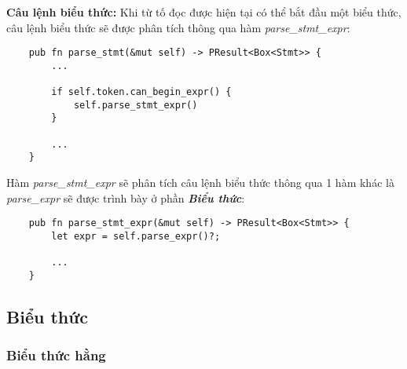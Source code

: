\textbf{Câu lệnh biểu thức:} Khi từ tố đọc được hiện tại có thể bắt đầu một biểu thức, câu lệnh biểu thức sẽ được phân tích thông qua hàm \textit{parse\_stmt\_expr}:
\begin{lstlisting}
    pub fn parse_stmt(&mut self) -> PResult<Box<Stmt>> {
        ...
    
        if self.token.can_begin_expr() {
            self.parse_stmt_expr()
        }
        
        ...
    }
\end{lstlisting}
Hàm \textit{parse\_stmt\_expr} sẽ phân tích câu lệnh biểu thức thông qua 1 hàm khác là \textit{parse\_expr} sẽ được trình bày ở phần \textbf{\textit{Biểu thức}}:
\begin{lstlisting}
    pub fn parse_stmt_expr(&mut self) -> PResult<Box<Stmt>> {
        let expr = self.parse_expr()?;
        
        ...
    }
\end{lstlisting}

\subsection{Biểu thức}
\subsubsection{Biểu thức hằng}

